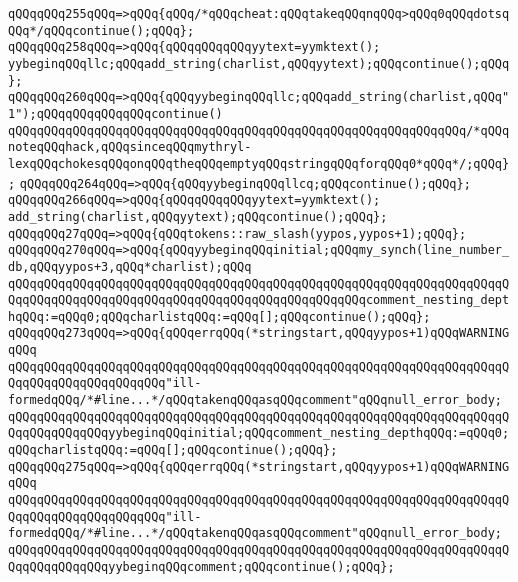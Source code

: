\verb|qQQqqQQq255qQQq=>qQQq{qQQq/*qQQqcheat:qQQqtakeqQQqnqQQq>qQQq0qQQqdotsqQQq*/qQQqcontinue();qQQq};|\newline
\verb|qQQqqQQq258qQQq=>qQQq{qQQqqQQqqQQqyytext=yymktext();|\newline
\verb|yybeginqQQqllc;qQQqadd_string(charlist,qQQqyytext);qQQqcontinue();qQQq};|\newline
\verb|qQQqqQQq260qQQq=>qQQq{qQQqyybeginqQQqllc;qQQqadd_string(charlist,qQQq"1");qQQqqQQqqQQqqQQqcontinue()|\newline
\verb|qQQqqQQqqQQqqQQqqQQqqQQqqQQqqQQqqQQqqQQqqQQqqQQqqQQqqQQqqQQqqQQq/*qQQqnoteqQQqhack,qQQqsinceqQQqmythryl-lexqQQqchokesqQQqonqQQqtheqQQqemptyqQQqstringqQQqforqQQq0*qQQq*/;qQQq};|\newline
\verb|qQQqqQQq264qQQq=>qQQq{qQQqyybeginqQQqllcq;qQQqcontinue();qQQq};|\newline
\verb|qQQqqQQq266qQQq=>qQQq{qQQqqQQqqQQqyytext=yymktext();|\newline
\verb|add_string(charlist,qQQqyytext);qQQqcontinue();qQQq};|\newline
\verb|qQQqqQQq27qQQq=>qQQq{qQQqtokens::raw_slash(yypos,yypos+1);qQQq};|\newline
\verb|qQQqqQQq270qQQq=>qQQq{qQQqyybeginqQQqinitial;qQQqmy_synch(line_number_db,qQQqyypos+3,qQQq*charlist);qQQq|\newline
\verb|qQQqqQQqqQQqqQQqqQQqqQQqqQQqqQQqqQQqqQQqqQQqqQQqqQQqqQQqqQQqqQQqqQQqqQQqqQQqqQQqqQQqqQQqqQQqqQQqqQQqqQQqqQQqqQQqqQQqqQQqcomment_nesting_depthqQQq:=qQQq0;qQQqcharlistqQQq:=qQQq[];qQQqcontinue();qQQq};|\newline
\verb|qQQqqQQq273qQQq=>qQQq{qQQqerrqQQq(*stringstart,qQQqyypos+1)qQQqWARNINGqQQq|\newline
\verb|qQQqqQQqqQQqqQQqqQQqqQQqqQQqqQQqqQQqqQQqqQQqqQQqqQQqqQQqqQQqqQQqqQQqqQQqqQQqqQQqqQQqqQQqqQQq"ill-formedqQQq/*#line...*/qQQqtakenqQQqasqQQqcomment"qQQqnull_error_body;|\newline
\verb|qQQqqQQqqQQqqQQqqQQqqQQqqQQqqQQqqQQqqQQqqQQqqQQqqQQqqQQqqQQqqQQqqQQqqQQqqQQqqQQqqQQqyybeginqQQqinitial;qQQqcomment_nesting_depthqQQq:=qQQq0;qQQqcharlistqQQq:=qQQq[];qQQqcontinue();qQQq};|\newline
\verb|qQQqqQQq275qQQq=>qQQq{qQQqerrqQQq(*stringstart,qQQqyypos+1)qQQqWARNINGqQQq|\newline
\verb|qQQqqQQqqQQqqQQqqQQqqQQqqQQqqQQqqQQqqQQqqQQqqQQqqQQqqQQqqQQqqQQqqQQqqQQqqQQqqQQqqQQqqQQqqQQq"ill-formedqQQq/*#line...*/qQQqtakenqQQqasqQQqcomment"qQQqnull_error_body;|\newline
\verb|qQQqqQQqqQQqqQQqqQQqqQQqqQQqqQQqqQQqqQQqqQQqqQQqqQQqqQQqqQQqqQQqqQQqqQQqqQQqqQQqqQQqyybeginqQQqcomment;qQQqcontinue();qQQq};|\newline
